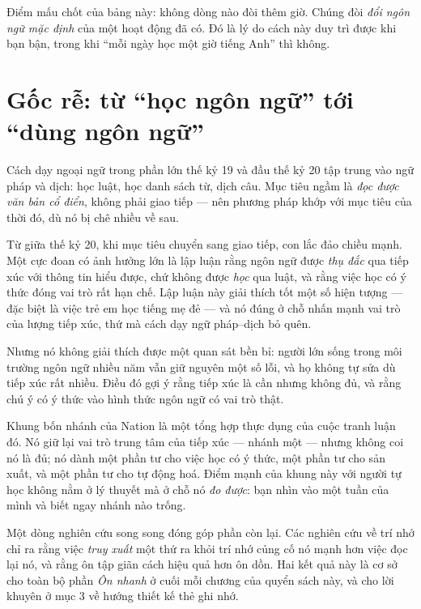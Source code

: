 \documentclass[../../english.tex]{subfiles}
\begin{document}
Điểm mấu chốt của bảng này: không dòng nào đòi thêm giờ. Chúng đòi \emph{đổi ngôn ngữ mặc định} của một hoạt động đã có. Đó là lý do cách này duy trì được khi bạn bận, trong khi ``mỗi ngày học một giờ tiếng Anh'' thì không.

\section{Gốc rễ: từ ``học ngôn ngữ'' tới ``dùng ngôn ngữ''}

Cách dạy ngoại ngữ trong phần lớn thế kỷ 19 và đầu thế kỷ 20 tập trung vào ngữ pháp và dịch: học luật, học danh sách từ, dịch câu. Mục tiêu ngầm là \emph{đọc được văn bản cổ điển}, không phải giao tiếp --- nên phương pháp khớp với mục tiêu của thời đó, dù nó bị chê nhiều về sau.

Từ giữa thế kỷ 20, khi mục tiêu chuyển sang giao tiếp, con lắc đảo chiều mạnh. Một cực đoan có ảnh hưởng lớn là lập luận rằng ngôn ngữ được \emph{thụ đắc} qua tiếp xúc với thông tin hiểu được, chứ không được \emph{học} qua luật, và rằng việc học có ý thức đóng vai trò rất hạn chế\cite{krashen1985}. Lập luận này giải thích tốt một số hiện tượng --- đặc biệt là việc trẻ em học tiếng mẹ đẻ --- và nó đúng ở chỗ nhấn mạnh vai trò của lượng tiếp xúc, thứ mà cách dạy ngữ pháp--dịch bỏ quên.

Nhưng nó không giải thích được một quan sát bền bỉ: người lớn sống trong môi trường ngôn ngữ nhiều năm vẫn giữ nguyên một số lỗi, và họ không tự sửa dù tiếp xúc rất nhiều. Điều đó gợi ý rằng tiếp xúc là cần nhưng không đủ, và rằng chú ý có ý thức vào hình thức ngôn ngữ có vai trò thật.

Khung bốn nhánh của Nation là một tổng hợp thực dụng của cuộc tranh luận đó\cite{nation2013,nation2006}. Nó giữ lại vai trò trung tâm của tiếp xúc --- nhánh một --- nhưng không coi nó là đủ; nó dành một phần tư cho việc học có ý thức, một phần tư cho sản xuất, và một phần tư cho tự động hoá. Điểm mạnh của khung này với người tự học không nằm ở lý thuyết mà ở chỗ nó \emph{đo được}: bạn nhìn vào một tuần của mình và biết ngay nhánh nào trống.

Một dòng nghiên cứu song song đóng góp phần còn lại. Các nghiên cứu về trí nhớ chỉ ra rằng việc \emph{truy xuất} một thứ ra khỏi trí nhớ củng cố nó mạnh hơn việc đọc lại nó\cite{roediger2006}, và rằng ôn tập giãn cách hiệu quả hơn ôn dồn\cite{cepeda2006}. Hai kết quả này là cơ sở cho toàn bộ phần \emph{Ôn nhanh} ở cuối mỗi chương của quyển sách này, và cho lời khuyên ở mục 3 về hướng thiết kế thẻ ghi nhớ.
\end{document}
